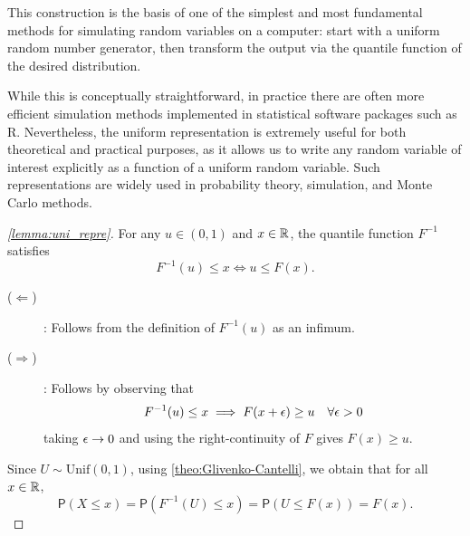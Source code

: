 This construction is the basis of one of the simplest and most fundamental methods for simulating random variables on a computer: start with a uniform random number generator, then transform the output via the quantile function of the desired distribution. 

While this is conceptually straightforward, in practice there are often more efficient simulation methods implemented in statistical software packages such as R. Nevertheless, the uniform representation is extremely useful for both theoretical and practical purposes, as it allows us to write any random variable of interest explicitly as a function of a uniform random variable. Such representations are widely used in probability theory, simulation, and Monte Carlo methods.

\begin{proof}[\autoref{lemma:uni_repre}]
    For any \(u \in (0,1)\) and \(x \in \mathbb{R}\),
the quantile function $F^{-1}$ satisfies
     \[
        F^{-1}(u) \le x \iff u \le F(x).
    \]
   \begin{description}
       \item[(\(\Longleftarrow\))] : Follows from the definition of \(F^{-1}(u)\) as an infimum.
       \item[(\(\Longrightarrow\))] : Follows by observing that \[
           F^{-1}(u) \le x \implies F(x + \epsilon) \ge  u \quad \forall \epsilon >0 
       \]
        taking \(\epsilon \to 0\) and using the right-continuity of $F$ gives $F(x) \ge u$.
    \end{description}
 Since $U \sim \text{Unif}(0,1)$, using \autoref{theo:Glivenko-Cantelli}, we obtain that for all \(x \in \mathbb{R}\),\[
       \mathsf{P}(X\le x) = \mathsf{P}(F^{-1}(U)\le x) = \mathsf{P}(U\le F(x)) = F(x).
   \]
\end{proof}

